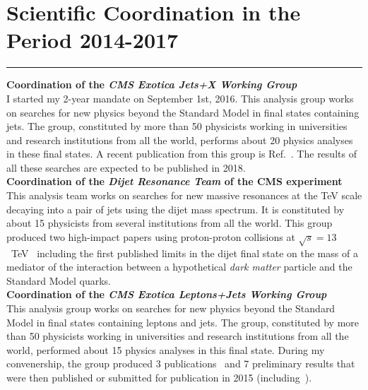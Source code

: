 \documentclass[10pt, a4paper]{article}
\newcommand{\years}[1]{\marginnote{\hskip-0.2in{\small #1}}}
\begin{document}
\section*{Scientific Coordination in the Period 2014-2017}
\vspace{-5pt}
\hrule
\vspace{10pt}
\years{09/2016 - today}\textbf{Coordination of the \emph{CMS Exotica
    Jets+X Working Group}} \\
I started my 2-year mandate on September 1st, 2016.
This analysis group works on searches for new physics beyond the
Standard Model in final states containing jets. The group, 
constituted by more than 50 physicists working in universities and
research institutions from all the world, performs
about 20 physics analyses in these final states. A recent publication
from this group is Ref.~\cite{Sirunyan:2017nvi}. The results of all these searches are
expected to be published in 2018. \\ [1em]
\years{09/2014 - 09/2016}\textbf{Coordination of the \emph{Dijet Resonance
  Team} of the CMS experiment}\\
This analysis team works on searches for new massive resonances at the TeV
scale decaying into a pair of jets using the dijet mass spectrum. It is
constituted by about 15 physicists from several institutions from
all the world. This group produced two high-impact papers using proton-proton
collisions at $\sqrt{s}=13$~TeV~\cite{Sirunyan:2016iap,Khachatryan:2015dcf} 
including the first published limits in the dijet final state on the
mass of a mediator of the interaction between a hypothetical {\it dark
  matter} particle and the Standard Model quarks.\\[1em]
\years{01/2013 - 01/2015}\textbf{Coordination of the \emph{CMS Exotica
    Leptons+Jets Working Group}}\\
This analysis group works on searches for new physics beyond the
Standard Model in final states containing leptons and jets. The group, 
constituted by more than 50 physicists working in universities and
research institutions from all the world, performed about 15 physics
analyses in this final state. During my convenership, the group
produced 3 publications~\cite{Khachatryan:2014ura,Khachatryan:2014dka,Khachatryan:2014gha}
and 7 preliminary results that were then published or submitted for
publication in 2015 (including~\cite{Khachatryan:2016yji,Khachatryan:2015ywa,Khachatryan:2015vaa}).
\end{document}
